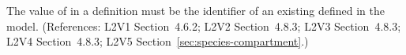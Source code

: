 The value of  in a \Species definition must be the
identifier of an existing \Compartment defined in the model.  (References:
L2V1 Section~4.6.2; L2V2 Section~4.8.3; L2V3 Section~4.8.3; L2V4 Section~4.8.3; L2V5 Section~\ref{sec:species-compartment}.)

